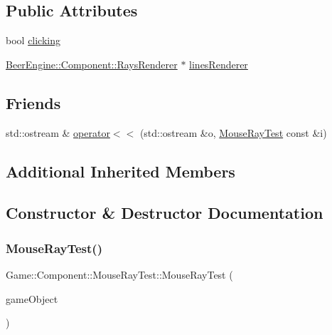 \subsection*{Public Attributes}
\begin{DoxyCompactItemize}
\item 
bool \mbox{\hyperlink{class_game_1_1_component_1_1_mouse_ray_test_a526049c590ec69e6dcdbf127aaa0a244}{clicking}}
\item 
\mbox{\hyperlink{class_beer_engine_1_1_component_1_1_rays_renderer}{Beer\+Engine\+::\+Component\+::\+Rays\+Renderer}} $\ast$ \mbox{\hyperlink{class_game_1_1_component_1_1_mouse_ray_test_a0c6d4f0a878531fcfc83add4258b8eae}{lines\+Renderer}}
\end{DoxyCompactItemize}
\subsection*{Friends}
\begin{DoxyCompactItemize}
\item 
std\+::ostream \& \mbox{\hyperlink{class_game_1_1_component_1_1_mouse_ray_test_a779a38a659ea997f8f091bc720620380}{operator$<$$<$}} (std\+::ostream \&o, \mbox{\hyperlink{class_game_1_1_component_1_1_mouse_ray_test}{Mouse\+Ray\+Test}} const \&i)
\end{DoxyCompactItemize}
\subsection*{Additional Inherited Members}


\subsection{Constructor \& Destructor Documentation}
\mbox{\label{class_game_1_1_component_1_1_mouse_ray_test_a99877b8b30c5523e5ccd69998fcbf866}} 
\subsubsection{\texorpdfstring{Mouse\+Ray\+Test()}{MouseRayTest()}}
{\footnotesize\ttfamily Game\+::\+Component\+::\+Mouse\+Ray\+Test\+::\+Mouse\+Ray\+Test (\begin{DoxyParamCaption}\item[{\mbox{\hyperlink{class_beer_engine_1_1_game_object}{Beer\+Engine\+::\+Game\+Object}} $\ast$}]{game\+Object }\end{DoxyParamCaption})}

